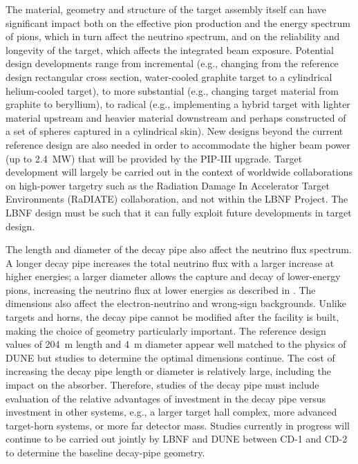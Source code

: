 The material, geometry and structure of the target assembly itself can have significant impact both on the effective pion production and the energy spectrum of pions, which in turn affect the neutrino spectrum, and on the reliability and longevity of 
the target, which affects the integrated beam exposure.  Potential design developments range from incremental (e.g., changing from the reference design rectangular cross section, water-cooled graphite target to a cylindrical 
helium-cooled target), to more substantial (e.g., changing target material from graphite to beryllium), to radical (e.g., implementing a hybrid target with lighter material upstream and heavier material downstream and perhaps constructed of a set of spheres captured in a 
cylindrical skin).  New designs beyond the current reference design are also needed in order to accommodate the higher beam power (up to 2.4~MW) that will be provided by the PIP-III upgrade.  
Target development will largely be carried out in the 
context of worldwide collaborations on high-power targetry such as the Radiation Damage In Accelerator Target 
Environments (RaDIATE) collaboration,  and not within the LBNF Project. The LBNF design must be such that it can fully exploit future developments in target design.
 
The length and diameter of the decay pipe also affect the neutrino flux spectrum.  A longer decay pipe increases the total neutrino flux with a larger increase at higher energies; a larger diameter allows the capture and decay of lower-energy pions, 
increasing the neutrino flux at lower energies as described in \volphys. The dimensions also affect the electron-neutrino and wrong-sign backgrounds.  Unlike targets and horns, the decay pipe cannot be modified after the facility is built, making the 
choice of geometry particularly important.  The reference design values of \SI{204}{\meter} length and \SI{4}{\meter} diameter appear well matched to the physics of DUNE but studies to determine the optimal dimensions continue.  The cost of increasing the decay 
pipe length or diameter  is relatively large, including 
the impact on the absorber.
Therefore, studies of the decay pipe must include 
evaluation of the relative advantages of
investment in the decay pipe versus investment in 
other systems, e.g., a larger target hall complex, more advanced target-horn systems, or more far detector mass.  %
Studies currently in progress will continue to be carried out jointly by LBNF and DUNE between CD-1 and CD-2 to determine the baseline decay-pipe geometry.

